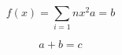 \documentclass[11pt]{article}
\begin{document}
    \begin{equation}
        f(x) = \sum_{i = 1}{n} x^2
        a = b
    \end{equation}

    \begin{equation}
        a + b = c
    \end{equation}
\end{document}
